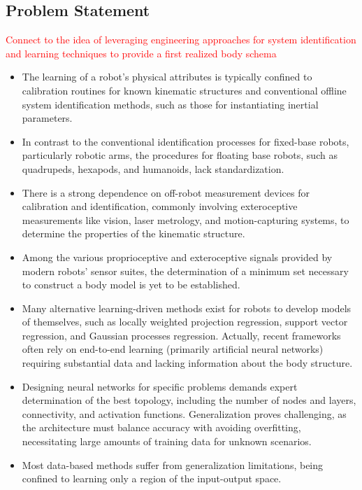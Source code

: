 \documentclass[12pt, a4paper]{article}
\newcommand{\redtext}[1]{\textcolor{red}{#1}}
\begin{document}
\subsection*{Problem Statement}
\redtext{Connect to the idea of leveraging engineering approaches for system identification and learning techniques to provide a first realized body schema}
\begin{itemize}
\item The learning of a robot's physical attributes is typically confined to calibration routines for known kinematic structures and conventional offline system identification methods, such as those for instantiating inertial parameters.

\item In contrast to the conventional identification processes for fixed-base robots, particularly robotic arms, the procedures for floating base robots, such as quadrupeds, hexapods, and humanoids, lack standardization.

\item There is a strong dependence on off-robot measurement devices for calibration and identification, commonly involving exteroceptive measurements like vision, laser metrology, and motion-capturing systems, to determine the properties of the kinematic structure.

\item Among the various proprioceptive and exteroceptive signals provided by modern robots' sensor suites, the determination of a minimum set necessary to construct a body model is yet to be established.

\item Many alternative learning-driven methods exist for robots to develop models of themselves, such as locally weighted projection regression, support vector regression, and Gaussian processes regression. Actually, recent frameworks often rely on end-to-end learning (primarily artificial neural networks) requiring substantial data and lacking information about the body structure.

\item Designing neural networks for specific problems demands expert determination of the best topology, including the number of nodes and layers, connectivity, and activation functions. Generalization proves challenging, as the architecture must balance accuracy with avoiding overfitting, necessitating large amounts of training data for unknown scenarios.

\item Most data-based methods suffer from generalization limitations, being confined to learning only a region of the input-output space.


\end{itemize}
\end{document}
